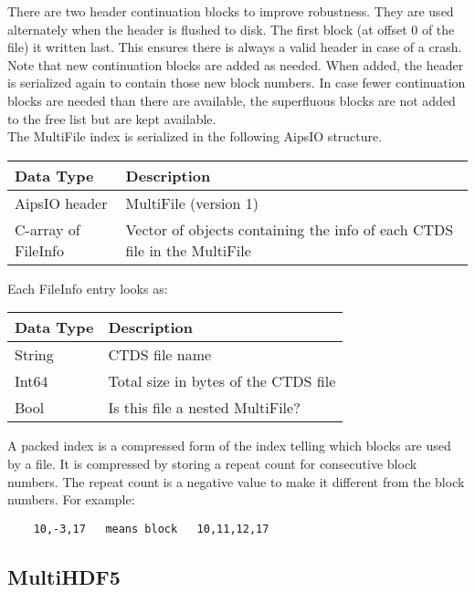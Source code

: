 There are two header continuation blocks to improve robustness. They
are used alternately when the header is flushed to disk. The first
block (at offset 0 of the file) it written last. This ensures there is
always a valid header in case of a crash.
Note that new continuation blocks are added as needed. When added, the
header is serialized again to contain those new block numbers. In case
fewer continuation blocks are needed than there are available, the
superfluous blocks are not  added to the free list but are kept
available. 
\\The MultiFile index is serialized in the following AipsIO structure.

\vspace{0.15in}
\begin{tabular}{|l|p{13cm}|} \hline
  Data Type & Description \\ \hline\hline
  AipsIO header & MultiFile (version 1) \\
  C-array of FileInfo &  Vector of objects containing the info of each
                        CTDS file in the MultiFile \\
  \hline
\end{tabular}
\vspace{0.15in}

Each FileInfo entry looks as:

\vspace{0.15in}
\begin{tabular}{|l|p{13cm}|} \hline
  Data Type & Description \\ \hline\hline
  String & CTDS file name \\
  Int64 & Total size in bytes of the CTDS file \\
  Bool & Is this file a nested MultiFile? \\
  \hline
\end{tabular}
\vspace{0.15in}

A packed index is a compressed form of the index telling which blocks
are used by a file. It is compressed by storing a repeat count for
consecutive block numbers. The repeat count is a negative value to
make it different from the block numbers. For example:
\begin{verbatim}
    10,-3,17   means block   10,11,12,17
\end{verbatim}


\subsection{MultiHDF5}
